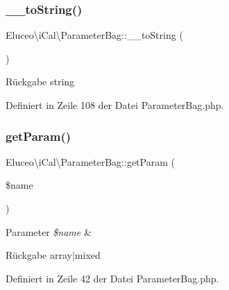 \subsubsection{\texorpdfstring{\+\_\+\+\_\+to\+String()}{\_\_toString()}\hspace{0.1cm}{\footnotesize\ttfamily [3/3]}}
{\footnotesize\ttfamily Eluceo\textbackslash{}i\+Cal\textbackslash{}\+Parameter\+Bag\+::\+\_\+\+\_\+to\+String (\begin{DoxyParamCaption}{ }\end{DoxyParamCaption})}

\begin{DoxyReturn}{Rückgabe}
string 
\end{DoxyReturn}


Definiert in Zeile 108 der Datei Parameter\+Bag.\+php.

\mbox{\label{class_eluceo_1_1i_cal_1_1_parameter_bag_add3451bf728adf15b29f69a51b2bff08}} 
\subsubsection{\texorpdfstring{get\+Param()}{getParam()}\hspace{0.1cm}{\footnotesize\ttfamily [1/3]}}
{\footnotesize\ttfamily Eluceo\textbackslash{}i\+Cal\textbackslash{}\+Parameter\+Bag\+::get\+Param (\begin{DoxyParamCaption}\item[{}]{\$name }\end{DoxyParamCaption})}


\begin{DoxyParams}{Parameter}
{\em \$name} & \\
\hline
\end{DoxyParams}
\begin{DoxyReturn}{Rückgabe}
array$\vert$mixed 
\end{DoxyReturn}


Definiert in Zeile 42 der Datei Parameter\+Bag.\+php.

\mbox{\label{class_eluceo_1_1i_cal_1_1_parameter_bag_add3451bf728adf15b29f69a51b2bff08}} 
